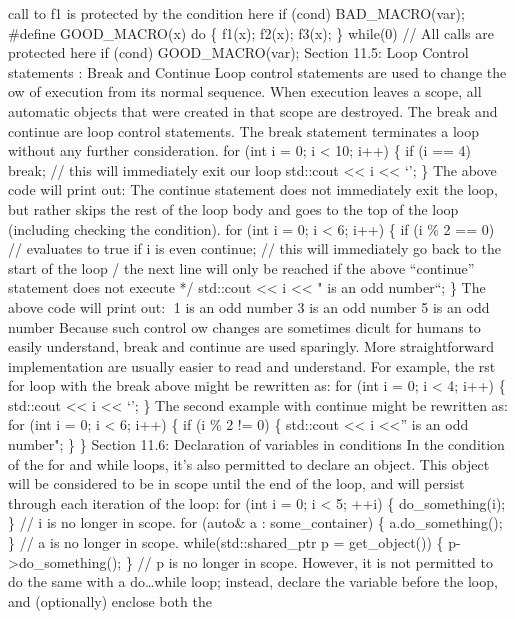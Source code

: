 {call to f1 is protected by the condition here if (cond) BAD\_MACRO(var);
\#define GOOD\_MACRO(x) do \{ f1(x); f2(x); f3(x); \} while(0) // All
calls are protected here if (cond) GOOD\_MACRO(var); Section 11.5: Loop
Control statements : Break and Continue Loop control statements are used
to change the ow of execution from its normal sequence. When execution
leaves a scope, all automatic objects that were created in that scope
are destroyed. The break and continue are loop control statements. The
break statement terminates a loop without any further consideration. for
(int i = 0; i \textless{} 10; i++) \{ if (i == 4) break; // this will
immediately exit our loop std::cout \textless\textless{} i
\textless\textless{} `\n'; \} The above code will print out: The
continue statement does not immediately exit the loop, but rather skips
the rest of the loop body and goes to the top of the loop (including
checking the condition). for (int i = 0; i \textless{} 6; i++) \{ if (i
\% 2 == 0) // evaluates to true if i is even continue; // this will
immediately go back to the start of the loop /} the next line will only
be reached if the above ``continue'' statement does not execute */
std::cout \textless\textless{} i \textless\textless{} " is an odd
number\n``; \} The above code will print out: 1 is an odd number 3 is
an odd number 5 is an odd number Because such control ow changes are
sometimes dicult for humans to easily understand, break and continue are
used sparingly. More straightforward implementation are usually easier
to read and understand. For example, the rst for loop with the break
above might be rewritten as: for (int i = 0; i \textless{} 4; i++) \{
std::cout \textless\textless{} i \textless\textless{} `\n'; \} The
second example with continue might be rewritten as: for (int i = 0; i
\textless{} 6; i++) \{ if (i \% 2 != 0) \{ std::cout
\textless\textless{} i \textless\textless{}'' is an odd number\n"; \} \}
Section 11.6: Declaration of variables in conditions In the condition of
the for and while loops, it's also permitted to declare an object. This
object will be considered to be in scope until the end of the loop, and
will persist through each iteration of the loop: for (int i = 0; i
\textless{} 5; ++i) \{ do\_something(i); \} // i is no longer in scope.
for (auto\& a : some\_container) \{ a.do\_something(); \} // a is no
longer in scope. while(std::shared\_ptr p = get\_object()) \{
p-\textgreater do\_something(); \} // p is no longer in scope. However,
it is not permitted to do the same with a do\ldots while loop; instead,
declare the variable before the loop, and (optionally) enclose both the
